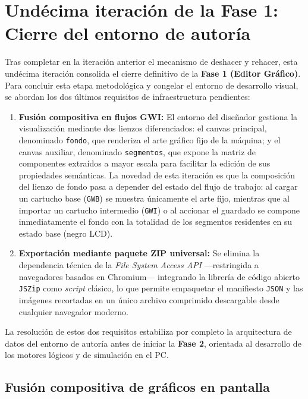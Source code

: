 \section{Undécima iteración de la Fase 1: Cierre del entorno de autoría}
\label{sec:CerrandoElDisenador}

Tras completar en la iteración anterior el mecanismo de deshacer y rehacer, esta undécima iteración consolida el cierre definitivo de la \textbf{Fase 1 (Editor Gráfico)}. Para concluir esta etapa metodológica y congelar el entorno de desarrollo visual, se abordan los dos últimos requisitos de infraestructura pendientes:

\begin{enumerate}
	\item \textbf{Fusión compositiva en flujos GWI:} El entorno del diseñador gestiona la visualización mediante dos lienzos diferenciados: el canvas principal, denominado \texttt{fondo}, que renderiza el arte gráfico fijo de la máquina; y el canvas auxiliar, denominado \texttt{segmentos}, que expone la matriz de componentes extraídos a mayor escala para facilitar la edición de sus propiedades semánticas. La novedad de esta iteración es que la composición del lienzo de fondo pasa a depender del estado del flujo de trabajo: al cargar un cartucho base (\texttt{GWB}) se muestra únicamente el arte fijo, mientras que al importar un cartucho intermedio (\texttt{GWI}) o al accionar el guardado se compone inmediatamente el fondo con la totalidad de los segmentos residentes en su estado base (negro LCD).
	
	\item \textbf{Exportación mediante paquete ZIP universal:} Se elimina la dependencia técnica de la \textit{File System Access API} ---restringida a navegadores basados en Chromium--- integrando la librería de código abierto \texttt{JSZip} como \textit{script} clásico, lo que permite empaquetar el manifiesto \texttt{JSON} y las imágenes recortadas en un único archivo comprimido descargable desde cualquier navegador moderno.
\end{enumerate}

La resolución de estos dos requisitos estabiliza por completo la arquitectura de datos del entorno de autoría antes de iniciar la \textbf{Fase 2}, orientada al desarrollo de los motores lógicos y de simulación en el PC.

\subsection{Fusión compositiva de gráficos en pantalla}
\label{subsec:FondoySegmentos}

